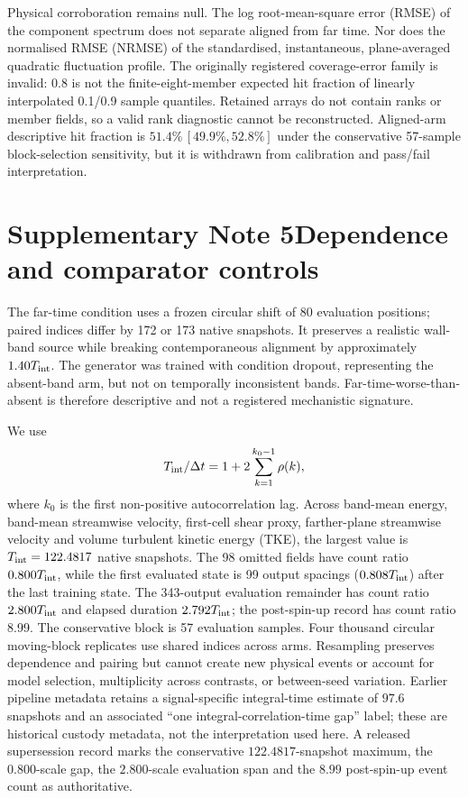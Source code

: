 \documentclass[11pt]{article}
\begin{document}
Physical corroboration remains null. The log root-mean-square error (RMSE) of the component
spectrum does not separate aligned from far time. Nor does the normalised RMSE (NRMSE) of the
standardised, instantaneous, plane-averaged quadratic fluctuation profile. The originally
registered coverage-error family is invalid:
0.8 is not the finite-eight-member expected hit fraction of linearly interpolated 0.1/0.9 sample
quantiles. Retained arrays do not contain ranks or member fields, so a valid rank diagnostic cannot
be reconstructed. Aligned-arm descriptive hit fraction is
$51.4\%\,[49.9\%,52.8\%]$ under the conservative 57-sample block-selection sensitivity, but it is
withdrawn from calibration and pass/fail interpretation.

\section*{Supplementary Note 5\quad Dependence and comparator controls}\label{sec:s-stats}

The far-time condition uses a frozen circular shift of 80 evaluation positions; paired indices
differ by 172 or 173 native snapshots. It preserves a realistic wall-band source while breaking
contemporaneous alignment by approximately $1.40T_{\rm int}$. The generator was trained
with condition dropout, representing the absent-band arm, but not on temporally inconsistent bands.
Far-time-worse-than-absent is therefore descriptive and not a registered mechanistic signature.

We use
\[
T_{\rm int}/\Delta t=1+2\sum_{k=1}^{k_0-1}\rho(k),
\]
where $k_0$ is the first non-positive autocorrelation lag. Across band-mean energy, band-mean
streamwise velocity, first-cell shear proxy, farther-plane streamwise velocity and volume
turbulent kinetic energy (TKE), the
largest value is $T_{\rm int}=122.4817$ native snapshots. The 98 omitted fields have count ratio
$0.800T_{\rm int}$, while the first evaluated state is 99 output spacings
($0.808T_{\rm int}$) after the last training state. The 343-output evaluation remainder has count
ratio $2.800T_{\rm int}$ and elapsed duration $2.792T_{\rm int}$; the post-spin-up record has count
ratio 8.99. The conservative block is 57 evaluation samples. Four thousand circular
moving-block replicates use shared indices across arms. Resampling preserves dependence and pairing
but cannot create new physical events or account for model selection, multiplicity across
contrasts, or between-seed variation.
Earlier pipeline metadata retains a signal-specific integral-time estimate of $97.6$ snapshots
and an associated ``one integral-correlation-time gap'' label; these are historical custody
metadata, not the interpretation used here. A released supersession record marks the
conservative $122.4817$-snapshot maximum, the $0.800$-scale gap, the $2.800$-scale evaluation
span and the $8.99$ post-spin-up event count as authoritative.
\end{document}
